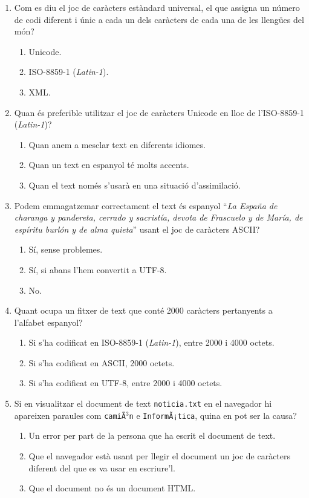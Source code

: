\begin{enumerate}
\item Com es diu el joc de caràcters estàndard universal, el que
  assigna un número de codi diferent i únic a cada un dels caràcters
  de cada una de les llengües del món?
  \begin{enumerate}
  \item Unicode.
  \item ISO-8859-1 (\emph{Latin-1}).
  \item XML.
  \end{enumerate}

\item Quan és preferible utilitzar el joc de caràcters Unicode en lloc
  de l'ISO-8859-1 (\emph{Latin-1})? 
  \begin{enumerate}
  \item Quan anem a mesclar text en diferents idiomes.
  \item Quan un text en espanyol té molts accents.
  \item Quan el text només s'usarà en una situació
    d'assimilació.
  \end{enumerate}

\item Podem emmagatzemar correctament el text és espanyol ``\emph{La
    España de charanga y pandereta, cerrado y sacristía, devota de
    Frascuelo y de María, de espíritu burlón y de alma quieta}'' usant
  el joc de caràcters ASCII? 
  \begin{enumerate}
  \item Sí, sense problemes.
  \item Sí, si abans l'hem convertit a UTF-8.
  \item No. 
  \end{enumerate}

\item Quant ocupa un fitxer de text que conté 2000 caràcters
  pertanyents a l'alfabet espanyol? 
  \begin{enumerate}
  \item Si s'ha codificat en ISO-8859-1 (\emph{Latin-1}), entre 2000 i
    4000 octets.
  \item Si s'ha codificat en ASCII, 2000 octets.  
  \item Si s'ha codificat en UTF-8, entre 2000 i 4000
    octets. 
  \end{enumerate}

\item Si en visualitzar el document de text \texttt{noticia.txt} en el
  navegador hi apareixen paraules com \texttt{camiÃ\(^3\)n} e
  \texttt{InformÃ¡tica}, quina en pot ser la causa? 
  \begin{enumerate}
  \item Un error per part de la persona que ha escrit el document de
    text.
  \item Que el navegador està usant per llegir el document un joc de
    caràcters diferent del que es va usar en escriure'l.
  \item Que el document no és un document HTML.
  \end{enumerate}

\end{enumerate}

